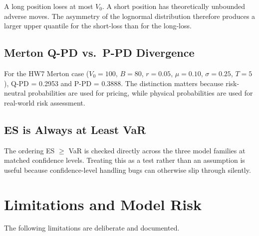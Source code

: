 \documentclass[11pt]{article}
\begin{document}
A long position loses at most $V_0$.  A short position has theoretically
unbounded adverse moves.  The asymmetry of the lognormal distribution
therefore produces a larger upper quantile for the short-loss than for
the long-loss.

\subsection{Merton Q-PD vs.\ P-PD Divergence}

For the HW7 Merton case ($V_0=100$, $B=80$, $r=0.05$, $\mu=0.10$,
$\sigma=0.25$, $T=5$), Q-PD = 0.2953 and P-PD = 0.3888.  The distinction
matters because risk-neutral probabilities are used for pricing, while
physical probabilities are used for real-world risk assessment.

\subsection{ES is Always at Least VaR}

The ordering ES $\geq$ VaR is checked directly across the three model
families at matched confidence levels.  Treating this as a test rather
than an assumption is useful because confidence-level handling bugs can
otherwise slip through silently.

\section{Limitations and Model Risk}
\label{sec:limitations}

The following limitations are deliberate and documented.
\end{document}
